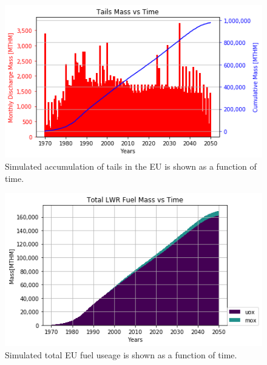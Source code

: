 \documentclass{article}
\begin{document}
\begin{figure}[htbp!]
    \begin{center}
        \includegraphics[scale=0.7]{./images/eu_future/tails.png}
    \end{center}
        \caption{Simulated accumulation of tails in the \gls{EU} is shown as a function of time.}
    \label{fig:eu_tail}
\end{figure}

\begin{figure}[htbp!]
    \begin{center}
        \includegraphics[scale=0.7]{./images/eu_future/total_fuel.png}
    \end{center}
\caption{Simulated total \gls{EU} fuel useage is shown as a function of time.}
    \label{fig:eu_fuel}
\end{figure}
\end{document}
